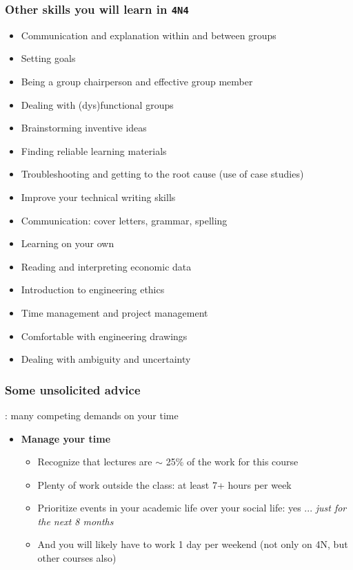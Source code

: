\begin{frame}\frametitle{Other skills you will learn in \texttt{4N4}}
	\begin{itemize}
		\item	Communication and explanation within and between groups
		\item	Setting goals		
		\item	Being a group chairperson and effective group member
		\item	Dealing with (dys)functional groups
		\item	Brainstorming inventive ideas
		\item	Finding reliable learning materials
		\item	Troubleshooting and getting to the root cause {\scriptsize (use of case studies)}
		\item	Improve your technical writing skills
		\item	Communication: cover letters, grammar, spelling
		\item	Learning on your own
		\item	Reading and interpreting economic data
		\item	Introduction to engineering ethics
		\item	Time management and project management
		\item	Comfortable with engineering drawings
		\item	Dealing with ambiguity and uncertainty
	\end{itemize}
\end{frame}

\begin{frame}\frametitle{Some unsolicited advice}
	\begin{exampleblock}{}
		{} : many competing demands on your time
	\end{exampleblock}
	\begin{itemize}
		\item	\textbf{Manage your time}
		\begin{itemize}
			\item	Recognize that lectures are $\sim$ 25\% of the work for this course
			\item	Plenty of work outside the class: at least 7+ hours per week
			\item	Prioritize events in your academic life over your social life: yes ... \emph{just for the next 8 months}
			\item	And you will likely have to work 1 day per weekend (not only on 4N, but other courses also)
		\end{itemize}
	\end{itemize}
\end{frame}

